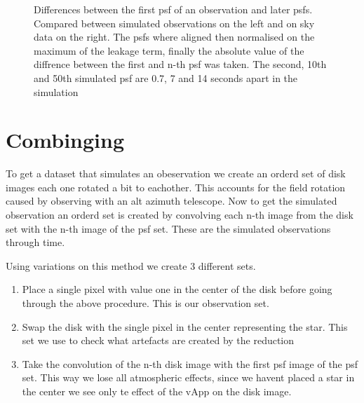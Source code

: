\begin{figure}[h!]

  \caption{Differences between the first psf of an observation and later psfs. Compared between simulated observations on the left and on sky data on the right. The psfs where aligned then normalised on the maximum of the leakage term, finally the absolute value of the diffrence between the first and n-th psf was taken. The second, 10th and 50th simulated psf are 0.7, 7 and 14 seconds apart in the simulation}
  \label{fig:psfs_evolving}
\end{figure}






\section{Combinging}

To get a dataset that simulates an obeservation we create an orderd set of disk images each one rotated a bit to eachother. This accounts for the field rotation caused by observing with an alt azimuth telescope. Now to get the simulated observation an orderd set is created by convolving each n-th image from the disk set with the n-th image of the psf set. These are the simulated observations through time. 

Using variations on this method we create 3 different sets.

\begin{enumerate}
\item Place a single pixel with value one in the center of the disk before going through the above procedure. This is our observation set.
\item Swap the disk with the single pixel in the center representing the star. This set we use to check what artefacts are created by the reduction 
\item Take the convolution of the n-th disk image with the first psf image of the psf set. This way we lose all atmospheric effects, since we havent placed a star in the center we see only te effect of the vApp on the disk image. 
\end{enumerate}
